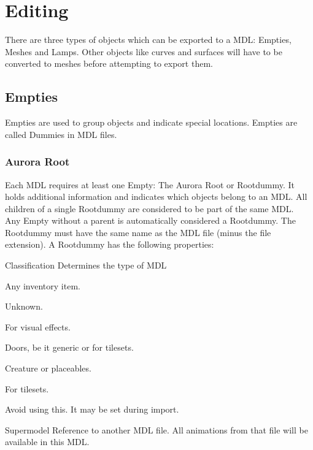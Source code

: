 \chapter{Editing}
There are three types of objects which can be exported to a MDL: Empties,
Meshes and Lamps. Other objects like curves and surfaces will have to be
converted to meshes before attempting to export them.

\section{Empties}
Empties are used to group objects and indicate special 
locations. Empties are called Dummies in MDL files.


\subsection{Aurora Root}
Each MDL requires at least one Empty: The Aurora Root or Rootdummy. It holds 
additional information and indicates which objects belong to an MDL. All children
of a single Rootdummy are considered to be part of the same MDL. \\

Any Empty without a parent is automatically considered a Rootdummy. 
The Rootdummy must have the same name as the MDL file (minus the file extension). 
A Rootdummy has the following properties:

\begin{propertyAurora}{Classification}
Determines the type of MDL
\begin{description}[leftmargin=6em,style=nextline]
    \item[Item] Any inventory item.
    \item[GUI] Unknown.
    \item[Effect] For visual effects.
    \item[Door] Doors, be it generic or for tilesets.
    \item[Character] Creature or placeables. 
    \item[Tile] For tilesets.
    \item[Unknown] Avoid using this. It may be set during import.
\end{description}
\end{propertyAurora}

\begin{propertyAurora}{Supermodel}
Reference to another MDL file. All animations from that file 
will be available in this MDL.
\end{propertyAurora}

